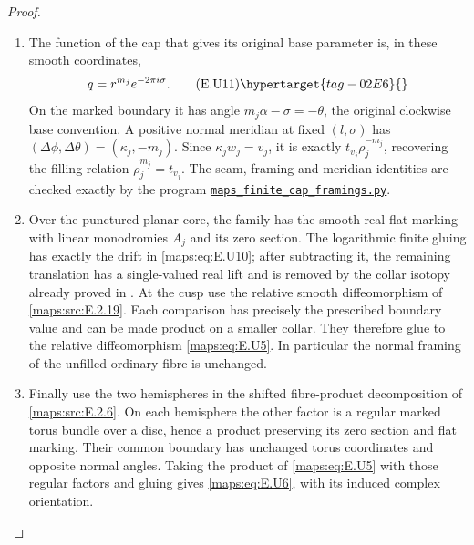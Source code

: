 \begin{proof}
\begin{enumerate}[label={$\langle1\rangle$\arabic*.},leftmargin=*]
\item The function of the cap that gives its original base parameter
is, in these smooth coordinates,
\[
                         q=r^{m_j}e^{-2\pi i\sigma}.
 \tag{E.U11}\hypertarget{tag-02E6}{}\label{maps:eq:E.U11}
\]
On the marked boundary it has angle
$m_j\alpha-\sigma=-\theta$, the original clockwise base
convention.  A positive normal meridian at fixed
$(l,\sigma)$ has $(\Delta\phi,\Delta\theta)=(\kappa_j,-m_j)$.
Since $\kappa_jw_j=v_j$, it is exactly $t_{v_j}\rho_j^{-m_j}$,
recovering the filling relation
$\rho_j^{m_j}=t_{v_j}$.    The seam, framing and meridian identities are checked exactly by the program \href{https://github.com/KokunoYumeto/s6-complex-structure-workbench/blob/83d76022bcd442278b760db9ff438afceed6c6ea/pro_returns/S6_10_PAPERS_checkpoint_15_20261119T1045Z/S6_10_PAPERS/code/III/maps_finite_cap_framings.py}{\texttt{maps\_finite\_cap\_framings.py}}.

\item Over the punctured planar core, the family has the
smooth real flat marking with linear monodromies $A_j$ and
its zero section.  The logarithmic finite gluing has exactly
the drift in \eqref{maps:eq:E.U10}; after subtracting it, the remaining
translation has a single-valued real lift and is removed by
the collar isotopy already proved in .    At the cusp use the relative smooth diffeomorphism of \ref{maps:src:E.2.19}.  Each comparison
has precisely the prescribed boundary value and can be
made product on a smaller collar.  They therefore glue to
the relative diffeomorphism \eqref{maps:eq:E.U5}.  In particular the
normal framing of the unfilled ordinary fibre is unchanged.

\item Finally use the two hemispheres in the shifted
fibre-product decomposition of \ref{maps:src:E.2.6}.  On each hemisphere
the other factor is a regular marked torus bundle over a
disc, hence a product preserving its zero section and flat
marking.  Their common boundary has unchanged torus
coordinates and opposite normal angles.  Taking the product
of \eqref{maps:eq:E.U5} with those regular factors and gluing gives
\eqref{maps:eq:E.U6}, with its induced complex orientation.  
\end{enumerate}
\end{proof}



